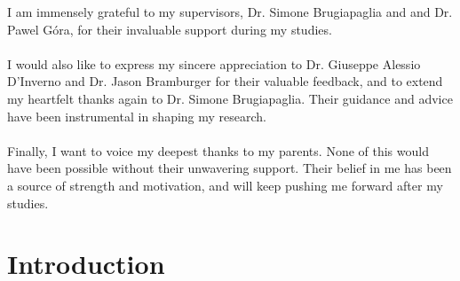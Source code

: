 \documentclass[12pt, oneside]{report}   	%
\makeatletter
\newcommand\mainmatter{%
    \cleardoublepage
  \pagenumbering{arabic}}
\makeatother
\begin{document}
I am immensely grateful to my supervisors, Dr. Simone Brugiapaglia and and Dr. Pawel Góra, for their invaluable support during my studies.\\\\
I would also like to express my sincere appreciation to Dr. Giuseppe Alessio D'Inverno and Dr. Jason Bramburger for their valuable feedback, and to extend my heartfelt thanks again to Dr. Simone Brugiapaglia. Their guidance and advice have been instrumental in shaping my research.\\\\
Finally, I want to voice my deepest thanks to my parents. None of this would have been possible without their unwavering support. Their belief in me has been a source of strength and motivation, and will keep pushing me forward after my studies.

\cleardoublepage

\setcounter{page}{5}
\tableofcontents


\listoffigures
{}

\mainmatter

\chapter{Introduction}
\label{chap:intro}
\end{document}

